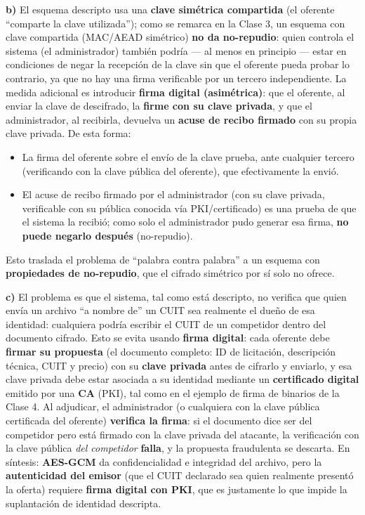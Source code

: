 \textbf{b)} El esquema descripto usa una \textbf{clave simétrica compartida} (el oferente
``comparte la clave utilizada''); como se remarca en la Clase 3, un esquema con clave
compartida (MAC/AEAD simétrico) \textbf{no da no-repudio}: quien controla el sistema
(el administrador) también podría --- al menos en principio --- estar en condiciones de
negar la recepción de la clave sin que el oferente pueda probar lo contrario, ya que no hay
una firma verificable por un tercero independiente. La medida adicional es introducir
\textbf{firma digital (asimétrica)}: que el oferente, al enviar la clave de descifrado,
la \textbf{firme con su clave privada}, y que el administrador, al recibirla, devuelva un
\textbf{acuse de recibo firmado} con su propia clave privada. De esta forma:
\begin{itemize}
  \item La firma del oferente sobre el envío de la clave prueba, ante cualquier tercero
  (verificando con la clave pública del oferente), que efectivamente la envió.
  \item El acuse de recibo firmado por el administrador (con su clave privada, verificable
  con su pública conocida vía PKI/certificado) es una prueba de que el sistema la recibió;
  como solo el administrador pudo generar esa firma, \textbf{no puede negarlo después}
  (no-repudio).
\end{itemize}
Esto traslada el problema de ``palabra contra palabra'' a un esquema con \textbf{propiedades
de no-repudio}, que el cifrado simétrico por sí solo no ofrece.

\textbf{c)} El problema es que el sistema, tal como está descripto, no verifica que quien
envía un archivo ``a nombre de'' un CUIT sea realmente el dueño de esa identidad: cualquiera
podría escribir el CUIT de un competidor dentro del documento cifrado. Esto se evita
usando \textbf{firma digital}: cada oferente debe \textbf{firmar su propuesta} (el
documento completo: ID de licitación, descripción técnica, CUIT y precio) con su
\textbf{clave privada} antes de cifrarlo y enviarlo, y esa clave privada debe estar
asociada a su identidad mediante un \textbf{certificado digital} emitido por una
\textbf{CA} (PKI), tal como en el ejemplo de firma de binarios de la Clase 4. Al
adjudicar, el administrador (o cualquiera con la clave pública certificada del oferente)
\textbf{verifica la firma}: si el documento dice ser del competidor pero está firmado con
la clave privada del atacante, la verificación con la clave pública \emph{del competidor}
\textbf{falla}, y la propuesta fraudulenta se descarta. En síntesis: \textbf{AES-GCM} da
confidencialidad e integridad del archivo, pero la \textbf{autenticidad del emisor} (que
el CUIT declarado sea quien realmente presentó la oferta) requiere \textbf{firma digital
con PKI}, que es justamente lo que impide la suplantación de identidad descripta.

